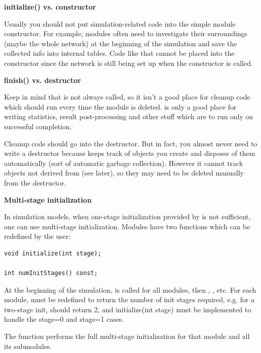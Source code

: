 \textbf{initialize() vs. constructor}


Usually you should not put simulation-related code into the
simple module constructor. For
example, modules often need to investigate their surroundings (maybe
the whole network) at the beginning of the simulation and save the
collected info into internal tables.  Code like that cannot be placed
into the constructor since the network is still being set up when the
constructor is called.


\textbf{finish() vs. destructor}


Keep in mind that  is not always called, so it isn't a
good place for cleanup code which should run every time the module is
deleted.  is only a good place for writing statistics,
result post-processing and other stuff which are to run only on
successful completion.

Cleanup code should go into the destructor. But in
fact, you almost never need to write a destructor because {\opp}
keeps track of objects you create and disposes of them automatically
(sort of automatic garbage collection). However it cannot track
objects not derived from  (see later), so they may
need to be deleted manually from the destructor.


\textbf{Multi-stage initialization}


In simulation models, when one-stage
initialization provided by 
is not sufficient, one can use multi-stage
initialization.  Modules have two
functions which can be redefined by the user:

\begin{Verbatim}
void initialize(int stage);

int numInitStages() const;
\end{Verbatim}

At the beginning of the simulation, 
is called for all modules, then ,
, etc. For each module,
 must be redefined to return the number of init
stages required, e.g. for a two-stage init, 
should return 2, and initialize(int stage) must be implemented to
handle the stage=0 and stage=1 cases.


The  function performs the full multi-stage initialization 
for that module and all its submodules.

